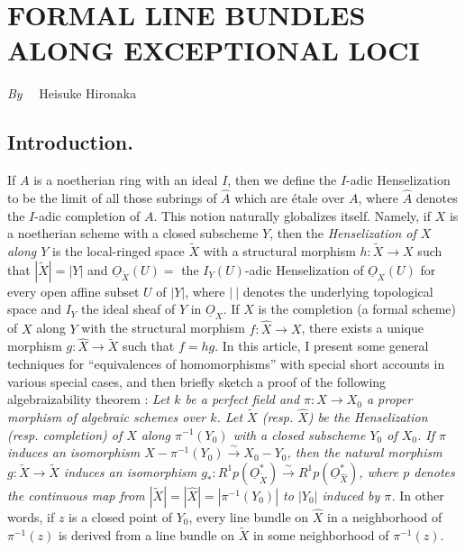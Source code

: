 \chapter[\textsc{H. Hironaka~:} Formal Line Bundles along Exceptional Loci]{FORMAL LINE BUNDLES ALONG EXCEPTIONAL LOCI}\label{art10}

\begin{center}
{\em By}~~ Heisuke Hironaka
\end{center}

\setcounter{pageoriginal}{200}
\section*{Introduction.}\pageoriginale


If $A$ is a noetherian ring with an ideal $I$, then we define the $I$-adic Henselization to be the limit of all those subrings of $\widehat{A}$ which are \'etale over $A$, where $\widehat{A}$ denotes the $I$-adic completion of $A$. This notion naturally globalizes itself. Namely, if $X$ is a noetherian scheme with a closed subscheme $Y$, then the {\em Henselization of $X$ along $Y$} is the local-ringed space $\widetilde{X}$ with a structural morphism $h:\widetilde{X}\to X$ such that $|\widetilde{X}|=|Y|$ and $\underline{O}_{\widetilde{X}}(U)=$ the $I_{Y}(U)$-adic Henselization of $\underline{O}_{X}(U)$ for every open affine subset $U$ of $|Y|$, where $|~|$ denotes the underlying topological space and $I_{Y}$ the ideal sheaf of $Y$ in $\underline{O}_{X}$. If $\widehat{X}$ is the completion (a formal scheme) of $X$ along $Y$ with the structural morphism $f:\widehat{X}\to X$, there exists a unique morphism $g:\widehat{X}\to \widetilde{X}$ such that $f=hg$. In this article, I present some general techniques for ``equivalences of homomorphisms'' with special short accounts in various special cases, and then briefly sketch a proof of the following algebraizability theorem : {\em Let $k$ be a perfect field and $\pi:X\to X_{0}$ a proper morphism of algebraic schemes over $k$. Let $\widetilde{X}$ (resp. $\widehat{X}$) be the Henselization (resp. completion) of $X$ along $\pi^{-1}(Y_{0})$ with a closed subscheme $Y_{0}$ of $X_{0}$. If $\pi$ induces an isomorphism $X-\pi^{-1}(Y_{0})\xrightarrow{\sim}X_{0}-Y_{0}$, then the natural morphism $g:\widetilde{X}\to \widetilde{X}$ induces an isomorphism $g_{*}:R^{1}p(\underline{O}_{\widetilde{X}}^{*})\xrightarrow{\sim}R^{1}p(\underline{O}_{\widehat{X}}^{*})$, where $p$ denotes the continuous map from $|\widetilde{X}|=|\widehat{X}|=|\pi^{-1}(Y_{0})|$ to $|Y_{0}|$ induced by $\pi$.} In other words, if $z$ is a closed point of $Y_{0}$, every line bundle on $\widehat{X}$ in a neighborhood of $\pi^{-1}(z)$ is derived from a line bundle on $\widetilde{X}$ in some neighborhood of $\pi^{-1}(z)$.

